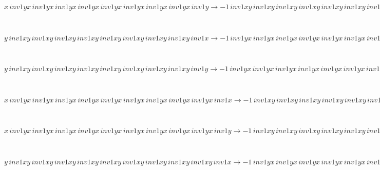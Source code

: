 \begin{minipage}{6in}
$
x\,
 inv1yx\,
 inv1yx\,
 inv1yx\,
 inv1yx\,
 inv1yx\,
 inv1yx\,
 inv1yx\,
 inv1yx\,
 inv1y\rightarrow -1\,
 inv1xy\,
 inv1xy\,
 inv1xy\,
 inv1xy\,
 inv1xy\,
 inv1xy\,
 inv1xy\,
 inv1y + inv1xy\,
 inv1xy\,
 inv1xy\,
 inv1xy\,
 inv1xy\,
 inv1xy\,
 inv1xy\,
 inv1xy\,
 inv1y + x\,
 inv1yx\,
 inv1yx\,
 inv1yx\,
 inv1yx\,
 inv1yx\,
 inv1yx\,
 inv1yx\,
 inv1yx
$
\end{minipage}\medskip \\
\begin{minipage}{6in}
$
y\,
 inv1xy\,
 inv1xy\,
 inv1xy\,
 inv1xy\,
 inv1xy\,
 inv1xy\,
 inv1xy\,
 inv1xy\,
 inv1x\rightarrow -1\,
 inv1yx\,
 inv1yx\,
 inv1yx\,
 inv1yx\,
 inv1yx\,
 inv1yx\,
 inv1yx\,
 inv1x + inv1yx\,
 inv1yx\,
 inv1yx\,
 inv1yx\,
 inv1yx\,
 inv1yx\,
 inv1yx\,
 inv1yx\,
 inv1x + y\,
 inv1xy\,
 inv1xy\,
 inv1xy\,
 inv1xy\,
 inv1xy\,
 inv1xy\,
 inv1xy\,
 inv1xy
$
\end{minipage}\medskip \\
\begin{minipage}{6in}
$
y\,
 inv1xy\,
 inv1xy\,
 inv1xy\,
 inv1xy\,
 inv1xy\,
 inv1xy\,
 inv1xy\,
 inv1xy\,
 inv1y\rightarrow -1\,
 inv1yx\,
 inv1yx\,
 inv1yx\,
 inv1yx\,
 inv1yx\,
 inv1yx\,
 inv1yx\,
 inv1yx + inv1yx\,
 inv1yx\,
 inv1yx\,
 inv1yx\,
 inv1yx\,
 inv1yx\,
 inv1yx\,
 inv1yx\,
 inv1y
$
\end{minipage}\medskip \\
\begin{minipage}{6in}
$
x\,
 inv1yx\,
 inv1yx\,
 inv1yx\,
 inv1yx\,
 inv1yx\,
 inv1yx\,
 inv1yx\,
 inv1yx\,
 inv1yx\,
 inv1x\rightarrow -1\,
 inv1xy\,
 inv1xy\,
 inv1xy\,
 inv1xy\,
 inv1xy\,
 inv1xy\,
 inv1xy\,
 inv1xy\,
 inv1xy + inv1xy\,
 inv1xy\,
 inv1xy\,
 inv1xy\,
 inv1xy\,
 inv1xy\,
 inv1xy\,
 inv1xy\,
 inv1xy\,
 inv1x
$
\end{minipage}\medskip \\
\begin{minipage}{6in}
$
x\,
 inv1yx\,
 inv1yx\,
 inv1yx\,
 inv1yx\,
 inv1yx\,
 inv1yx\,
 inv1yx\,
 inv1yx\,
 inv1yx\,
 inv1y\rightarrow -1\,
 inv1xy\,
 inv1xy\,
 inv1xy\,
 inv1xy\,
 inv1xy\,
 inv1xy\,
 inv1xy\,
 inv1xy\,
 inv1y + inv1xy\,
 inv1xy\,
 inv1xy\,
 inv1xy\,
 inv1xy\,
 inv1xy\,
 inv1xy\,
 inv1xy\,
 inv1xy\,
 inv1y + x\,
 inv1yx\,
 inv1yx\,
 inv1yx\,
 inv1yx\,
 inv1yx\,
 inv1yx\,
 inv1yx\,
 inv1yx\,
 inv1yx
$
\end{minipage}\medskip \\
\begin{minipage}{6in}
$
y\,
 inv1xy\,
 inv1xy\,
 inv1xy\,
 inv1xy\,
 inv1xy\,
 inv1xy\,
 inv1xy\,
 inv1xy\,
 inv1xy\,
 inv1x\rightarrow -1\,
 inv1yx\,
 inv1yx\,
 inv1yx\,
 inv1yx\,
 inv1yx\,
 inv1yx\,
 inv1yx\,
 inv1yx\,
 inv1x + inv1yx\,
 inv1yx\,
 inv1yx\,
 inv1yx\,
 inv1yx\,
 inv1yx\,
 inv1yx\,
 inv1yx\,
 inv1yx\,
 inv1x + y\,
 inv1xy\,
 inv1xy\,
 inv1xy\,
 inv1xy\,
 inv1xy\,
 inv1xy\,
 inv1xy\,
 inv1xy\,
 inv1xy
$
\end{minipage}\medskip \\
